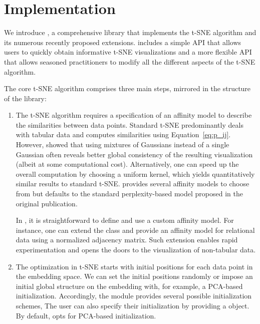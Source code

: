 \documentclass[article]{jss}
\newcommand{\opentsne}{\pkg{openTSNE}\xspace}
\begin{document}
\section{Implementation} \label{sec:implementation}

We introduce \opentsne, a comprehensive  library that implements the t-SNE algorithm and its numerous recently proposed extensions. \opentsne includes a simple API that allows users to quickly obtain informative t-SNE visualizations and a more flexible API that allows seasoned practitioners to modify all the different aspects of the t-SNE algorithm.

The core t-SNE algorithm comprises three main steps, mirrored in the structure of the \opentsne library:

\begin{enumerate}
\item The t-SNE algorithm requires a specification of an affinity model to describe the similarities between data points. Standard t-SNE predominantly deals with tabular data and computes similarities using Equation~\ref{eq:p_ij}. However, \citet{kobak2019art} showed that using mixtures of Gaussians instead of a single Gaussian often reveals better global consistency of the resulting visualization (albeit at some computational cost). Alternatively, one can speed up the overall computation by choosing a uniform kernel, which yields quantitatively similar results to standard t-SNE.  provides several affinity models to choose from but defaults to the standard perplexity-based model proposed in the original publication.

In \opentsne, it is straightforward to define and use a custom affinity model. For instance, one can extend the  class and provide an affinity model for relational data using a normalized adjacency matrix. Such extension enables rapid experimentation and opens the doors to the visualization of non-tabular data.  

\item The optimization in t-SNE starts with initial positions for each data point in the embedding space. We can set the initial positions randomly or impose an initial global structure on the embedding with, for example, a PCA-based initialization. Accordingly, the  module provides several possible initialization schemes, The user can also specify their initialization by providing a  object. By default, \opentsne opts for PCA-based initialization.


\end{enumerate}
\end{document}
